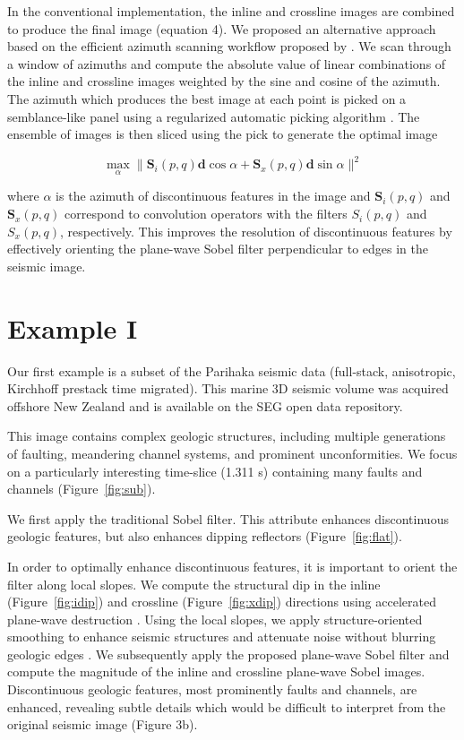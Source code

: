 In the conventional implementation, the inline and crossline images are combined to produce the final image (equation 4).
We proposed an alternative approach based on the efficient azimuth scanning workflow proposed by \cite{merzlikin}. 
We scan through a window of azimuths and compute the absolute value of linear combinations of the inline and crossline images weighted by the sine and cosine of the azimuth.
The azimuth which produces the best image at each point is picked on a semblance-like panel using a regularized automatic picking algorithm \cite[]{fomel09}.
The ensemble of images is then sliced using the pick to generate the optimal image

\begin{equation}
\max_\alpha\|\mathbf{S}_i(p,q)\mathbf{d}\cos\alpha+\mathbf{S}_x(p,q)\mathbf{d}\sin\alpha\|^2
\end{equation}

where $\alpha$ is the azimuth of discontinuous features in the image and $\mathbf{S}_i(p,q)$ and $\mathbf{S}_x(p,q)$ correspond to convolution operators with the filters $S_i(p,q)$ and $S_x(p,q)$, respectively. This improves the resolution of discontinuous features by effectively orienting the plane-wave Sobel filter perpendicular to edges in the seismic image.

\section{Example I}
Our first example is a subset of the Parihaka seismic data (full-stack, anisotropic, Kirchhoff prestack time migrated).
This marine 3{D} seismic volume was acquired offshore New Zealand and is available on the SEG open data repository.


This image contains complex geologic structures, including multiple generations of faulting, meandering channel systems, and prominent unconformities.
We focus on a particularly interesting time-slice (1.311 s) containing many faults and channels (Figure~\ref{fig:sub}).

We first apply the traditional Sobel filter.
This attribute enhances discontinuous geologic features, but also enhances dipping reflectors (Figure~\ref{fig:flat}).

In order to optimally enhance discontinuous features, it is important to orient the filter along local slopes.
We compute the structural dip in the inline (Figure~\ref{fig:idip}) and crossline (Figure~\ref{fig:xdip}) directions using accelerated plane-wave destruction \cite[]{apwd}.
Using the local slopes, we apply structure-oriented smoothing to enhance seismic structures and attenuate noise without blurring geologic edges \cite[]{liu}.
We subsequently apply the proposed plane-wave Sobel filter and compute the magnitude of the inline and crossline plane-wave Sobel images.
Discontinuous geologic features, most prominently faults and channels, are enhanced, revealing subtle details which would be difficult to interpret from the original seismic image (Figure 3b).

